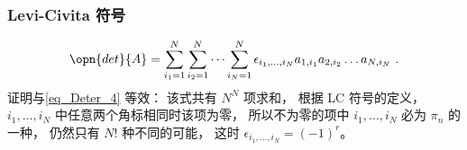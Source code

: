 \subsubsection{Levi-Civita 符号}
\begin{equation}
\opn{det}{A} = \sum_{i_1 = 1}^N \sum_{i_2 = 1}^N \dots \sum_{i_N = 1}^N \epsilon_{i_1, \dots, i_N} a_{1,i_1}a_{2,i_2}\dots a_{N,i_N}~.
\end{equation}
证明与\autoref{eq_Deter_4} 等效： 该式共有 $N^N$ 项求和， 根据 LC 符号的定义， $i_1, \dots, i_N$ 中任意两个角标相同时该项为零， 所以不为零的项中 $i_1, \dots, i_N$ 必为 $\pi_n$ 的一种， 仍然只有 $N!$ 种不同的可能， 这时 $\epsilon_{i_1, \dots, i_N} = (-1)^{r}$。
